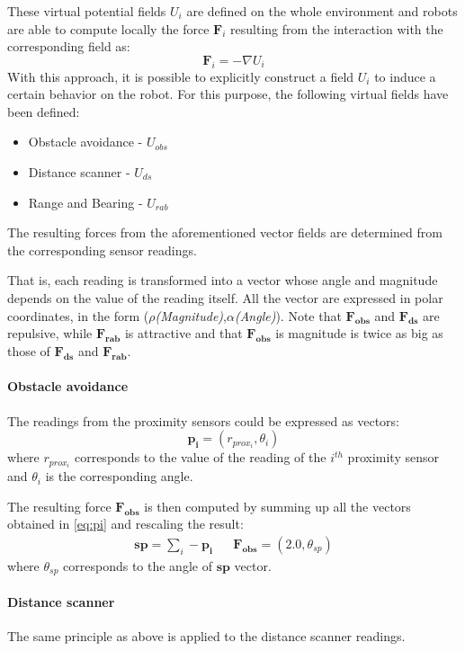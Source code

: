These virtual potential fields $U_i$ are defined on the whole environment and robots are able to compute locally the force $\mathbf{F}_i$ resulting from the interaction with the corresponding field as:
\begin{equation}
  \mathbf{F}_i = -\nabla U_i
\end{equation}
With this approach, it is possible to explicitly construct a field $U_i$ to induce a certain behavior on the robot.
For this purpose, the following virtual fields have been defined:
\begin{itemize}
  \item Obstacle avoidance - $U_{obs}$
  \item Distance scanner - $U_{ds}$
  \item Range and Bearing - $U_{rab}$
\end{itemize} 

The resulting forces from the aforementioned vector fields are determined from the corresponding sensor readings.

That is, each reading is transformed into a vector whose angle and magnitude depends on the value of the reading itself.
All the vector are expressed in polar coordinates, in the form ($\rho$\emph{(Magnitude)},$\alpha$\emph{(Angle)}).
Note that $\mathbf{F_{obs}}$ and $\mathbf{F_{ds}}$ are repulsive, while $\mathbf{F_{rab}}$ 
is attractive and that $\mathbf{F_{obs}}$ is magnitude is twice as big as those of $\mathbf{F_{ds}}$ and $\mathbf{F_{rab}}$.

\paragraph{Obstacle avoidance}
The readings from the proximity sensors could be expressed as vectors:
\begin{equation} \label{eq:pi}
\mathbf{p_i} = (r_{prox_{i}},\theta_i)  
\end{equation}
where $r_{prox_i}$ corresponds to the value of the reading of the $i^{th}$ proximity sensor and $\theta_i$ is the corresponding angle.

The resulting force $\mathbf{F_{obs}}$ is then computed by summing up all the vectors obtained in \ref{eq:pi} and rescaling the result:
\begin{align}
\mathbf{sp} = \sum_i -\mathbf{p_i} & & \mathbf{F_{obs}} = (2.0,\theta_{sp})   
\end{align}
where $\theta_{sp}$ corresponds to the angle of $\mathbf{sp}$ vector.

\paragraph{Distance scanner}
The same principle as above is applied to the distance scanner readings.

